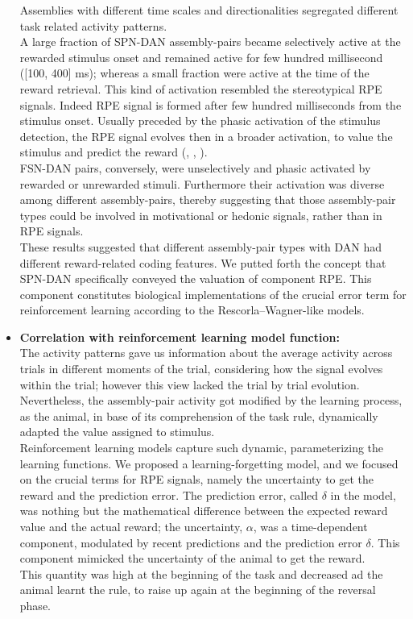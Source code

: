 \begin{itemize}
    Assemblies with different time scales and directionalities segregated different task related activity patterns.\\A large fraction of SPN-DAN assembly-pairs became selectively active at the rewarded stimulus onset and remained active for few hundred millisecond ([100, 400] ms); whereas a small fraction were active at the time of the reward retrieval. This kind of activation resembled the stereotypical RPE signals. Indeed RPE signal is formed after few hundred milliseconds from the stimulus onset. Usually preceded by the phasic activation of the stimulus detection, the RPE signal evolves then in a broader activation, to value the stimulus and predict the reward (\cite{Tobler2003}, \cite{Nomoto2010}, \cite{Schultz2016}).\\%
    FSN-DAN pairs, conversely, were unselectively and phasic activated by rewarded or unrewarded stimuli. Furthermore their activation was diverse among different assembly-pairs, thereby suggesting that those assembly-pair types could be involved in motivational or hedonic signals, rather than in RPE signals.\\These results suggested that different assembly-pair types with DAN had different reward-related coding features. We putted forth the concept that SPN-DAN specifically conveyed the valuation of component RPE. This component constitutes biological implementations of the crucial error term for reinforcement learning according to the Rescorla–Wagner-like models. 
    \item \textbf{Correlation with reinforcement learning model function:}\\The activity patterns gave us information about the average activity across trials in different moments of the trial, considering how the signal evolves within the trial; however this view lacked the trial by trial evolution. Nevertheless, the assembly-pair activity got modified by the learning process, as the animal, in base of its comprehension of the task rule, dynamically adapted the value assigned to stimulus.\\Reinforcement learning models capture such dynamic, parameterizing the learning functions. We proposed a learning-forgetting model, and we focused on the crucial terms for RPE signals, namely the uncertainty to get the reward and the prediction error. The prediction error, called $\delta$ in the model, was nothing but the mathematical difference between the expected reward value and the actual reward; the uncertainty, $\alpha$, was a time-dependent component, modulated by recent predictions and the prediction error $\delta$. This component mimicked the uncertainty of the animal to get the reward.\\This quantity was high at the beginning of the task and decreased ad the animal learnt the rule, to raise up again at the beginning of the reversal phase.%

\end{itemize}
